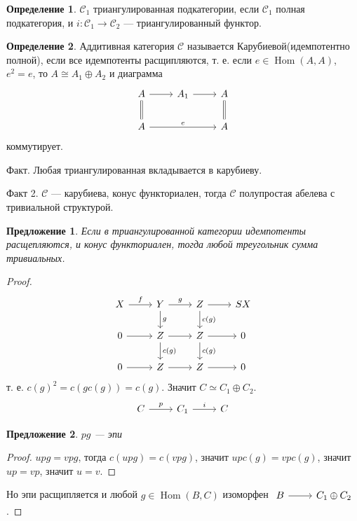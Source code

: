 \documentclass{article}
\newtheorem*{proposition}{Предложение}
\theoremstyle{definition}
\newtheorem*{definition}{Определение}
\theoremstyle{remark}
\DeclareMathOperator{\Hom}{Hom}
\newcommand{\Cat}{\mathcal{C}}
\newenvironment{cd}{\begin{equation*}\begin{tikzcd}}{\end{tikzcd}\end{equation*}}
\begin{document}
\begin{definition}
    $\Cat_1$ триангулированная подкатегории, если $\Cat_1$ полная подкатегория, и $i: \Cat_1 \rightarrow \Cat_2$ --- триангулированный функтор.
\end{definition}

\begin{definition}
    Аддитивная категория $\Cat$ называется Карубиевой(идемпотентно полной), если все идемпотенты расщипляются, т. е. если $e \in \Hom(A, A)$, $e^2 = e$, то $A \cong A_1 \oplus A_2$ и диаграмма
    \begin{cd}
    A \rar \dar[equal] & A_1 \rar & A \dar[equal] \\
    A \ar[rr, "e"] & & A
    \end{cd}
    коммутирует.
\end{definition}

Факт. Любая триангулированная вкладывается в карубиеву.

Факт 2. $\Cat$ --- карубиева, конус функториален, тогда $\Cat$ полупростая абелева с тривиальной структурой.

\begin{proposition}
    Если в триангулированной категории идемпотенты расщепляются, и конус функториален, тогда любой треугольник сумма тривиальных.
\end{proposition}
\begin{proof}
    \begin{cd}
        X \rar["f"] & Y \rar["g"] \dar["g"] & Z \dar["c(g)"] \rar & SX \\
        0 \rar & Z \rar  \dar["c(g)"]& Z \rar \dar["c(g)"]& 0 \\
        0 \rar & Z \rar & Z \rar & 0
    \end{cd}
    т. е. $c(g)^2 = c(gc(g)) = c(g)$. Значит $C \simeq C_1 \oplus C_2$.
    \begin{cd}
        C \rar["p"] & C_1 \rar["i"] & C
    \end{cd}
    \begin{proposition}
        $pg$ --- эпи
    \end{proposition}
    \begin{proof}
    $upg = vpg$, тогда $c(upg) = c(vpg)$, значит $upc(g) = vpc(g)$, значит $up = vp$, значит $u = v$. 
    \end{proof}
    Но эпи расщипляется и любой $g \in \Hom(B, C)$ изоморфен $\begin{tikzcd} B \rar & C_1 \oplus C_2 \end{tikzcd}$. 
\end{proof}
\end{document}
